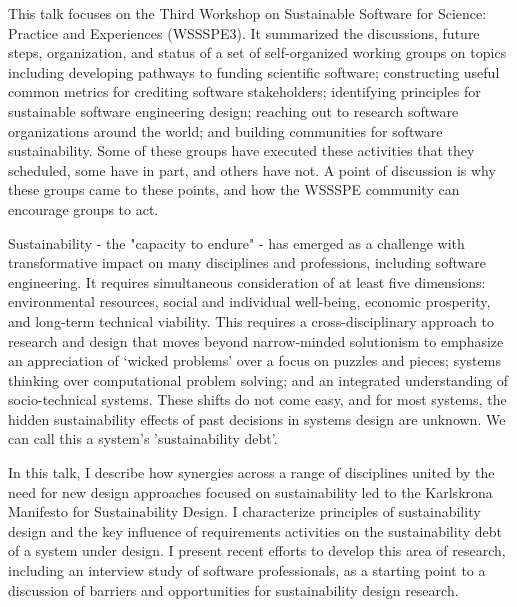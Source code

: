 \documentclass[a4paper,UKenglish]{dagrep}
\begin{document}
This talk focuses on the Third Workshop on Sustainable Software for Science: Practice and Experiences (WSSSPE3). It summarized the discussions, future steps, organization, and status of a set of self-organized working groups on topics including developing pathways to funding scientific software; constructing useful common metrics for crediting software stakeholders; identifying principles for sustainable software engineering design; reaching out to research software organizations around the world; and building communities for software sustainability. Some of these groups have executed these activities that they scheduled, some have in part, and others have not.  A point of discussion is why these groups came to these points, and how the WSSSPE community can encourage groups to act.



Sustainability - the "capacity to endure" - has emerged as a challenge with transformative impact on many disciplines and professions, including software engineering. It requires simultaneous consideration of at least five dimensions: environmental resources, social and individual well-being, economic prosperity, and long-term technical viability. This requires a cross-disciplinary approach to research and design that moves beyond narrow-minded solutionism to emphasize an appreciation of ‘wicked problems’ over a focus on puzzles and pieces; systems thinking over computational problem solving; and an integrated understanding of socio-technical systems. These shifts do not come easy, and for most systems, the hidden sustainability effects of past decisions in systems design are unknown. We can call this a system's 'sustainability debt'.

In this talk, I describe how synergies across a range of disciplines united by the need for new design approaches focused on sustainability led to the Karlskrona Manifesto for Sustainability Design. I characterize principles of sustainability design and the key influence of requirements activities on the sustainability debt of a system under design. I present recent efforts to develop this area of research, including an interview study of software professionals, as a starting point to a discussion of barriers and opportunities for sustainability design research.
\end{document}
